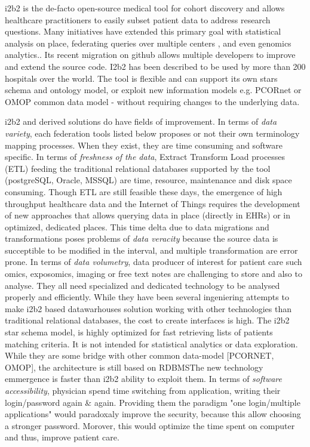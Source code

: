 \documentclass{amia}
\begin{document}
i2b2 is the de-facto open-source medical tool for cohort discovery and allows healthcare practitioners to easily subset patient data to address research questions. Many initiatives have extended this primary goal with statistical analysis on place, federating queries over multiple centers\cite{shrine,insite,trinetx} , and even genomics analytics.\cite{transmart,i2b2-transmart}. Its recent migration on github allows multiple developers to improve and extend the source code. I2b2 has been described to be used by more than 200 hospitals over the world. The tool is flexible and can support its own stars schema and ontology model, or exploit new information models e.g. PCORnet\cite{pcornet} or OMOP common data model\cite{ref14} - without requiring changes to the underlying data. 

i2b2 and derived solutions do have fields of improvement.  In terms of \textit{data variety}, each federation tools listed below proposes or not their own terminology mapping processes\cite{shrine}. When they exist\cite{ehr4crlesson}, they are time consuming and software specific\cite{i2b2map}.  In terms of \textit{freshness of the data}, Extract Transform Load processes (ETL) feeding the traditional relational databases supported by the tool (postgreSQL, Oracle, MSSQL) are time, resource, maintenance and disk space consuming. Though ETL are still feasible these days, the emergence of high throughput healthcare data and the Internet of Things requires the development of new approaches that allows querying data in place (directly in EHRs) or in optimized, dedicated places. This time delta due to data migrations and transformations poses problems of \textit{data veracity} because the source data is succeptible to be modified in the interval, and multiple transformation are error prone.  In terms of \textit{data volumetry}, data producer of interest for patient care such omics, exposomics, imaging or free text notes are challenging to store and also to analyse. They all need specialized and dedicated technology to be analysed properly and efficiently. While they have been several ingeniering attempts to make i2b2 based datawarhouses solution working with other technologies than traditional relational databases, the cost to create interfaces is high\cite{i2b2nosql}. The i2b2 star schema model, is highly optimized for fast retrieving lists of patients matching criteria. It is not intended for statistical analytics or data exploration\cite{i2b2export}. While they are some bridge with other common data-model [PCORNET, OMOP], the architecture is still based on RDBMS\cite{pcornet}The new technology emmergence is faster than i2b2 ability to exploit them.  In terms of \textit{software accessibility}, physician spend time switching from application, writing their login/password again \& again. Providing them the paradigm "one login/multiple applications" would paradoxaly improve the security, because this allow choosing a stronger password. Morover, this would optimize the time spent on computer and thus, improve patient care.
\end{document}
